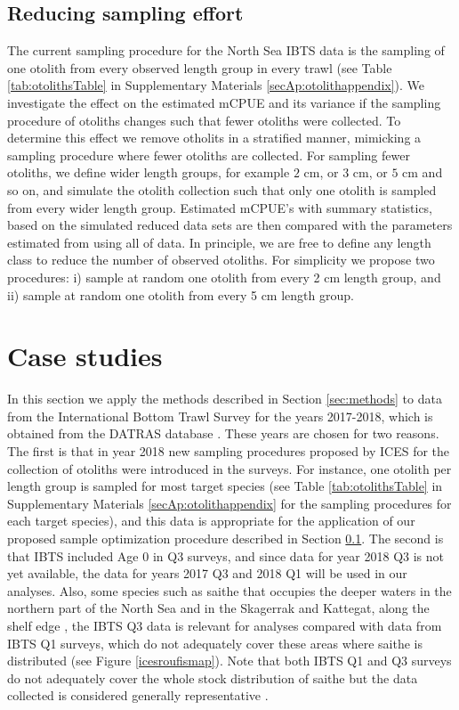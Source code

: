 \documentclass[a4paper 12pt]{article}
\numberwithin{equation}{section}
\begin{document}
\subsection{Reducing sampling effort}
\label{sec:optimizationsampling}
The current sampling procedure for the North Sea IBTS data is the sampling of one otolith from every observed length group in every trawl (see Table \ref{tab:otolithsTable} in Supplementary Materials \ref{secAp:otolithappendix}). We investigate the effect on the estimated mCPUE and its variance if the sampling procedure of otoliths changes such that fewer otoliths were collected. To determine this effect we remove otholits in a stratified manner, mimicking a sampling procedure where fewer otoliths are collected. For sampling fewer otoliths, we define wider length groups, for example $2$ cm, or $3$ cm, or $5$ cm and so on,  and simulate the otolith  collection such that only one otolith is sampled from every wider length group. Estimated mCPUE's with summary statistics, based on the simulated reduced data sets are then compared with the parameters estimated from using all of data. In principle, we are free to define any length class to reduce the number of observed otoliths. For simplicity we propose two procedures: i) sample at random  one otolith from every 2 cm length group, and ii) sample at random one otolith from every 5 cm length group. 

\section{Case studies}
\label{sec:data}
In this section we apply the methods described in Section \ref{sec:methods} to data from the International Bottom Trawl Survey for the years 2017-2018, which is obtained from the DATRAS database \citep{datras}. These years are chosen for two reasons. The first is that in year 2018 new sampling procedures proposed by ICES for the collection of otoliths were introduced in the surveys. For instance, one otolith per length group is sampled for most target species (see Table \ref{tab:otolithsTable} in Supplementary Materials \ref{secAp:otolithappendix} for the sampling procedures for each target species), and this data is appropriate for the application of our proposed sample optimization procedure described in Section \ref{sec:optimizationsampling}. The second is that IBTS included Age 0 in Q3 surveys, and since data for year 2018 Q3 is not yet available, the data for years 2017 Q3 and 2018 Q1 will be used in our analyses. Also, some species such as saithe that occupies the deeper waters in the northern part of the North Sea and in the Skagerrak and Kattegat, along the shelf edge \citep{ICESFishMaps}, the IBTS Q3 data is relevant for analyses compared with data from IBTS Q1 surveys, which do not adequately cover these areas where saithe is distributed (see Figure \ref{icesroufismap}). Note that both IBTS Q1 and Q3 surveys do not adequately cover the whole stock distribution of saithe but the data collected is considered generally representative \citep{ICESJune2016}.
\end{document}
